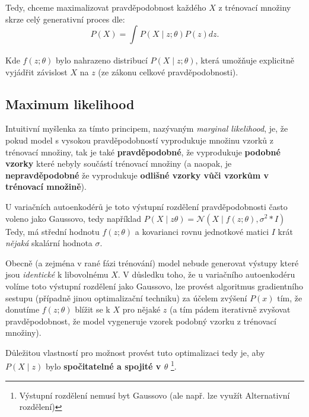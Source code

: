 Tedy, chceme maximalizovat pravděpodobnost každého $X$ z trénovací množiny skrze celý generativní proces dle:
\begin{equation}\label{eq:maximum_likelihood}
    P(X) = \int_{}^{} P(X\mid z;\theta)P(z)dz.
\end{equation}

Kde $f(z;\theta)$ bylo nahrazeno distribucí $P(X\mid z;\theta)$, která umožňuje explicitně vyjádřit závislost $X$ na $z$ (ze zákonu celkové pravděpodobnosti). \cite{Doersch2021}

\subsection{Maximum likelihood}
\label{sec:maximum_likelihood}
Intuitivní myšlenka za tímto principem, nazývaným \emph{marginal likelihood}, je, že pokud model s vysokou pravděpodobností vyprodukuje množinu vzorků z trénovací množiny, tak je také \textbf{pravděpodobné}, že vyprodukuje \textbf{podobné vzorky} které nebyly součástí trénovací množiny (a naopak, je  \textbf{nepravděpodobné} že vyprodukuje \textbf{odlišné vzorky vůči vzorkům v trénovací množině}). \cite{Doersch2021}

U variačních autoenkodérů je toto výstupní rozdělení pravděpodobnosti často voleno jako Gaussovo, tedy například $P(X\mid z\theta) = \mathcal{N}(X\mid f(z;\theta), \sigma^2 * I)$
Tedy, má střední hodnotu $f(z;\theta)$ a kovarianci rovnu jednotkové matici $I$ krát \emph{nějaká} skalární hodnota $\sigma$. \cite{Doersch2021}

Obecně (a zejména v rané fázi trénování) model nebude generovat výstupy které jsou \emph{identické} k libovolnému $X$.
V důsledku toho, že u variačního autoenkodéru volíme toto výstupní rozdělení jako Gaussovo, lze provést algoritmus gradientního sestupu (případně jinou optimalizační techniku) za účelem zvýšení $P(x)$ tím, že donutíme $f(z;\theta)$ blížit se k $X$ pro nějaké $z$ (a tím pádem iterativně zvyšovat pravděpodobnost, že model vygeneruje vzorek podobný vzorku z trénovací množiny). \cite{Doersch2021}

Důležitou vlastností pro možnost provést tuto optimalizaci tedy je, aby $P(X \mid z)$ bylo \textbf{spočitatelné a spojité v $\theta$} \footnote{Výstupní rozdělení nemusí byt Gaussovo (ale např. lze využít Alternativní rozdělení)}. \cite{Doersch2021}